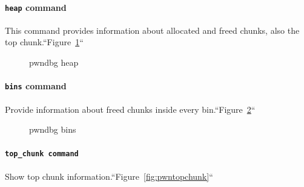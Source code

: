 \documentclass{masterthesis}
\begin{document}
\paragraph{\lstinline{heap} command}
This command provides information about allocated and freed chunks, also the top chunk.``Figure~\ref{fig:pwnheap}``

\begin{figure}[h!]
\caption{pwndbg heap}
\label{fig:pwnheap}
\end{figure}

\paragraph{\lstinline{bins} command}
Provide information about freed chunks inside every bin.``Figure~\ref{fig:pwnbins}``

\begin{figure}[h!]
\caption{pwndbg bins}
\label{fig:pwnbins}
\end{figure}

\paragraph{\lstinline{top_chunk command}}

Show top chunk information.``Figure~\ref{fig:pwntopchunk}``
\end{document}

